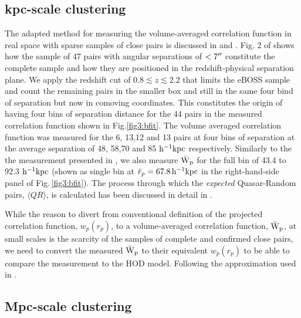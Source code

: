 \documentclass[useAMS,usenatbib]{mn2e}
\begin{document}
\subsection{kpc-scale clustering}\label{kpcls}
The adapted method for measuring the volume-averaged correlation function in real space with sparse samples of close pairs is discussed in \citet{ef17} and \citet{Hen06}. Fig. 2 of \citet{ef17} shows how the sample of 47 pairs with angular separations of $<7\arcsec$ constitute the complete sample and how they are positioned in the redshift-physical separation plane. We apply the redshift cut of $0.8 \lesssim z \lesssim 2.2$ that limits the eBOSS sample and count the remaining pairs in the smaller box and still in the same four bind of separation but now in comoving coordinates. This constitutes the origin of having four bins of separation distance for the 44 pairs in the measured correlation function shown in Fig.\ref{fig3:bfit}. The volume averaged correlation function was measured for the 6, 13,12 and 13 pairs at four bins of separation at the average separation of 48, 58,70 and 85 $\rm h^{-1} kpc$ respectively. Similarly to the the measurement presented in \citet{ef17}, we also measure $\rm \bar W_p$ for the full bin of 43.4 to 92.3 $\rm h^{-1} kpc$ (shown as single bin at $\bar r_p = 67.8 \, \rm h^{-1} kpc$ in the right-hand-side panel of Fig.\,\ref{fig3:bfit}). The process through which the {\it expected} Quasar-Random pairs, $\langle QR \rangle$, is calculated has been discussed in detail in \citet{ef17}. 

While the reason to divert from conventional definition of the projected 
correlation function, $w_p(r_p)$, to a volume-averaged correlation function, 
$\rm \bar W_p$, at small scales is the scarcity of the samples of complete and 
confirmed close pairs, we need to convert the measured $\rm \bar W_p$ to their equivalent $w_p(r_p)$ to be able to compare the measurement to the HOD model. 
Following the approximation used in \citet{ko12}.  

\subsection{Mpc-scale clustering}\label{mpcls}
\end{document}
